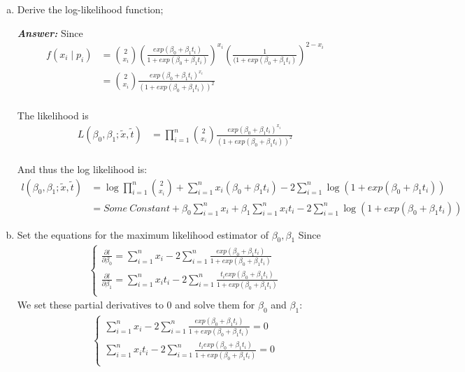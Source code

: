 \documentclass[12pt]{article}
\begin{document}
 \begin{enumerate}[(a)]
\item Derive the log-likelihood function;

  \textbf{\color{TealBlue}\emph{Answer: } }
Since
\begin{align*}
f(x_i \mid p_i) &= {2 \choose x_i} \left(\frac{ exp(\beta_0 + \beta_1 t_i) } { 1 +  exp(\beta_0 + \beta_1 t_i)} \right)^{x_i}     \left( \frac{1} { ( 1 +  exp(\beta_0 + \beta_1 t_i) } \right)^{2 - x_i} \\
&=  {2 \choose x_i}  \frac{ exp(\beta_0 + \beta_1 t_i)^{x_i} } { (1 +  exp(\beta_0 + \beta_1 t_i) )^2} \\
\end{align*}

The likelihood is
\begin{align*}
L(\beta_0, \beta_1 ; \tilde x, \tilde t) &= \prod_{i=1}^n {2 \choose x_i} \frac{ exp(\beta_0 + \beta_1 t_i)^{x_i} } { (1 +  exp(\beta_0 + \beta_1 t_i) )^{2}} \\
\end{align*}

And thus the log likelihood is:
\begin{align*}
l(\beta_0, \beta_1  ; \tilde x, \tilde t) &= \log \prod_{i=1}^n {2 \choose x_i} +  \sum_{i=1}^n x_i (\beta_0 + \beta_1 t_i) - 2 \sum_{i=1}^n \log (1 + exp(\beta_0 + \beta_1 t_i) ) \\
&= Some \ Constant +  \beta_0 \sum_{i=1}^n x_i   + \beta_1 \sum_{i=1}^n x_i t_i - 2  \sum_{i=1}^n \log (1 + exp(\beta_0 + \beta_1 t_i) )
\end{align*}


\item  Set the equations for the maximum likelihood estimator of $\beta_0, \beta_1$
Since
\begin{align*}
    \begin{cases} 
         \frac {\partial l} {\partial \beta_0} = \sum_{i=1}^n x_i - 2 \sum_{i=1}^n \frac{ exp(\beta_0 + \beta_1 t_i) } {1 + exp(\beta_0 + \beta_1 t_i) }\\
         \frac {\partial l} {\partial \beta_1} = \sum_{i=1}^n x_i t_i - 2 \sum_{i=1}^n \frac{ t_i exp(\beta_0 + \beta_1 t_i) } {1 + exp(\beta_0 + \beta_1 t_i) }\\
    \end{cases}
\end{align*}
We set these partial derivatives to 0 and solve them for $\beta_0$ and $\beta_1$:
\begin{align*}
    \begin{cases} 
         \sum_{i=1}^n x_i - 2 \sum_{i=1}^n \frac{ exp(\beta_0 + \beta_1 t_i) } {1 + exp(\beta_0 + \beta_1 t_i) } = 0\\
         \sum_{i=1}^n x_i t_i - 2 \sum_{i=1}^n \frac{ t_i exp(\beta_0 + \beta_1 t_i) } {1 + exp(\beta_0 + \beta_1 t_i) } = 0\\
    \end{cases}
\end{align*}


\end{enumerate}
\end{document}
